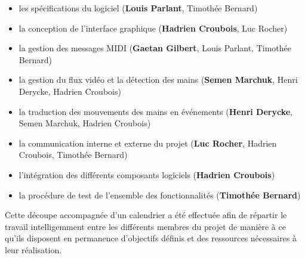 \begin{itemize}
    \item les spécifications du logiciel (\textbf{Louis Parlant}, Timothée Bernard)
    \item la conception de l'interface graphique (\textbf{Hadrien Croubois}, Luc Rocher)
    \item la gestion des messages MIDI (\textbf{Gaetan Gilbert}, Louis Parlant, Timothée Bernard)
    \item la gestion du flux vidéo et la détection des mains (\textbf{Semen Marchuk}, Henri Derycke, Hadrien Croubois)
    \item la traduction des mouvements des mains en événements (\textbf{Henri Derycke}, Semen Marchuk, Hadrien Croubois)
    \item la communication interne et externe du projet (\textbf{Luc Rocher}, Hadrien Croubois, Timothée Bernard)
    \item l'intégration des différents composants logiciels (\textbf{Hadrien Croubois})
    \item la procédure de test de l'ensemble des fonctionnalités (\textbf{Timothée Bernard})
\end{itemize}
\par Cette découpe accompagnée d'un calendrier a été effectuée afin de répartir le travail intelligemment entre les différents membres du projet de manière à ce qu'ils disposent en permanence d'objectifs définis et des ressources nécessaires à leur réalisation.
